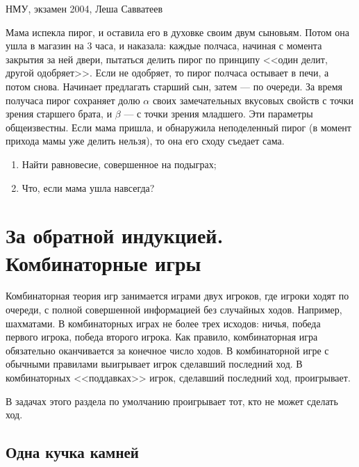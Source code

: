 \begin{problem}
\begin{source}
НМУ, экзамен 2004, Леша Савватеев
\end{source}
 Мама испекла пирог, и оставила его в духовке своим двум сыновьям. Потом она ушла в магазин на 3 часа, и наказала: каждые полчаса, начиная с момента закрытия за ней двери, пытаться делить пирог по принципу <<один делит, другой одобряет>>. Если не одобряет, то пирог полчаса остывает в печи, а потом снова. Начинает предлагать старший сын, затем --- по очереди. За время получаса пирог сохраняет долю $\alpha$ своих замечательных вкусовых свойств с точки зрения старшего брата, и $\beta$ --- с точки зрения младшего. Эти параметры общеизвестны. Если мама пришла, и обнаружила неподеленный пирог (в момент прихода мамы уже делить нельзя), то она его сходу съедает сама.
\begin{enumerate}
\item Найти равновесие, совершенное на подыграх;
\item Что, если мама ушла навсегда?
\end{enumerate}






\begin{sol}

\end{sol}
\end{problem}






\section{За обратной индукцией. Комбинаторные игры}


Комбинаторная теория игр занимается играми двух игроков, где игроки ходят по очереди, с полной совершенной информацией без случайных ходов. Например, шахматами. В комбинаторных играх не более трех исходов: ничья, победа первого игрока, победа второго игрока. Как правило, комбинаторная игра обязательно оканчивается за конечное число ходов. В комбинаторной игре с обычными правилами выигрывает игрок сделавший последний ход. В комбинаторных <<поддавках>> игрок, сделавший последний ход, проигрывает.

В задачах этого раздела по умолчанию проигрывает тот, кто не может сделать ход.

\subsection{Одна кучка камней}

